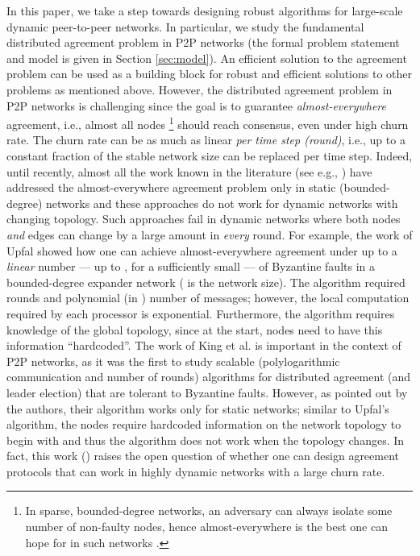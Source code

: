 \documentclass[leqno,11pt]{article}
\begin{document}
In this paper, we take a step towards  designing robust  algorithms for large-scale dynamic
peer-to-peer networks. In particular, we  study the fundamental  distributed agreement problem in  P2P networks (the formal problem statement and model is given in Section \ref{sec:model}). An efficient solution to the agreement problem can be used as a building block for robust and efficient solutions to other problems as mentioned above. 
However, the distributed agreement problem in P2P networks is challenging since the goal
is to guarantee {\em almost-everywhere} agreement, i.e., almost all nodes
\footnote{In sparse, bounded-degree networks,
an adversary can always isolate some number of non-faulty nodes, hence almost-everywhere is
the best one can hope for in such networks \cite{DPPU88}.} 
should reach consensus,  even under high churn rate. The churn rate
can be as much as linear  {\em per time step (round)},  i.e., up to a constant fraction of the stable network size can be replaced per time step.  
Indeed, until recently, almost all the work 
 known in the literature (see e.g., \cite{DPPU88,KKKSS10, KS10,KSS06, Upfal94})  have addressed the almost-everywhere agreement problem only in
 static (bounded-degree) networks and these approaches do not work for dynamic networks with changing topology. 
Such approaches fail in dynamic networks where both nodes {\em and} edges can change by a large amount
in {\em every} round.
   For example, the work of Upfal \cite{Upfal94} showed how
 one can achieve almost-everywhere agreement under up to a {\em linear} number --- up to , for a sufficiently small  ---  of Byzantine faults in a bounded-degree expander network ( is the network size).  The algorithm required  rounds and polynomial (in ) number of messages; however,  the local computation required by
each processor is exponential.  Furthermore, the algorithm  requires  knowledge
of the global topology, since at the start, nodes need to have this information
``hardcoded''.
 The work of King et al. \cite{KSSV06} is important in the context of P2P networks, as it was the first to study scalable (polylogarithmic communication and number of rounds) algorithms for distributed agreement (and leader election)
that are tolerant to Byzantine faults. However, as pointed out by the authors, their algorithm works only for static networks; similar to Upfal's algorithm, the nodes require 
hardcoded information on the network topology to begin with  and thus the
algorithm does not work when the topology changes.  In fact, this work (\cite{KSSV06})
raises the open question of whether one can design agreement  protocols that
can work in highly dynamic networks with a large churn rate.
\end{document}
